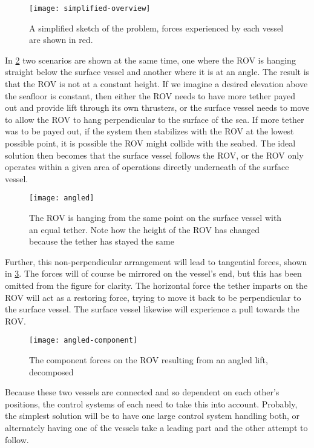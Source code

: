 \begin{figure}
	\centering
	\texttt{[image: simplified-overview]}
	\caption{A simplified sketch of the problem, forces experienced by each vessel are shown in red.}
	\label{fig:simple}
\end{figure}

In \cref{fig:angled} two scenarios are shown at the same time, one where the ROV is hanging straight below the surface vessel and another where it is at an angle. The result is that the ROV is not at a constant height. If we imagine a desired elevation above the seafloor is constant, then either the ROV needs to have more tether payed out and provide lift through its own thrusters, or the surface vessel needs to move to allow the ROV to hang perpendicular to the surface of the sea. If more tether was to be payed out, if the system then stabilizes with the ROV at the lowest possible point, it is possible the ROV might collide with the seabed. The ideal solution then becomes that the surface vessel follows the ROV, or the ROV only operates within a given area of operations directly underneath of the surface vessel. 

\begin{figure}
	\centering
	\texttt{[image: angled]}
	\caption{The ROV is hanging from the same point on the surface vessel with an equal tether. Note how the height of the ROV has changed because the tether has stayed the same}
	\label{fig:angled}
\end{figure}

Further, this non-perpendicular arrangement will lead to tangential forces, shown in \cref{fig:angled-force}. The forces will of course be mirrored on the vessel's end, but this has been omitted from the figure for clarity. The horizontal force the tether imparts on the ROV will act as a restoring force, trying to move it back to be perpendicular to the surface vessel. The surface vessel likewise will experience a pull towards the ROV. 

\begin{figure}
	\centering
	\texttt{[image: angled-component]}
	\caption{The component forces on the ROV resulting from an angled lift, decomposed}
	\label{fig:angled-force}
\end{figure}

Because these two vessels are connected and so dependent on each other's positions, the control systems of each need to take this into account. Probably, the simplest solution will be to have one large control system handling both, or alternately having one of the vessels take a leading part and the other attempt to follow.  

